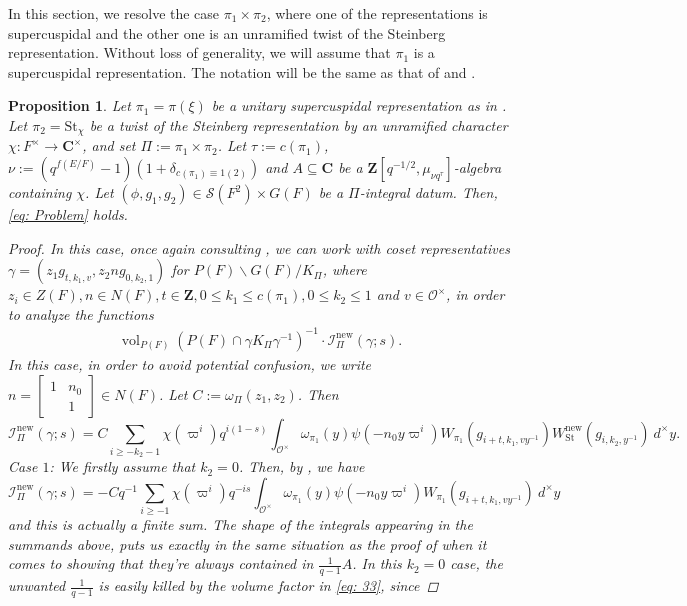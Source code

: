 \documentclass{amsart}
\theoremstyle{plain}
\newtheorem{prop}[thm]{Proposition}
\theoremstyle{plain}
\theoremstyle{remark}
\DeclareMathOperator{\vol}{vol}
\begin{document}
In this section, we resolve the case $\pi_1\times \pi_2$, where one of the representations is supercuspidal and the other one is an unramified twist of the Steinberg representation. Without loss of generality, we will assume that $\pi_1$ is a supercuspidal representation. The notation will be the same as that of  and .
\begin{prop}\label{thm sup x unr St}
    Let $\pi_1=\pi(\xi)$ be a unitary supercuspidal representation as in \emph{}. Let $\pi_2=\mathrm{St}_\chi$ be a twist of the Steinberg representation by an unramified character $\chi:F^\times\rightarrow\mathbf{C}^\times$, and set $\Pi:=\pi_1\times \pi_2$. Let $\tau:=c(\pi_1)$, $\nu:=(q^{f(E/F)}-1)(1+\delta_{c(\pi_1)\equiv 1(2)})$ and $A\subseteq\mathbf{C}$ be a $\mathbf{Z}[q^{-1/2},\mu_{\nu q^\tau}]$-algebra containing $\chi$. Let $(\phi,g_1,g_2)\in\mathcal{S}(F^2)\times G(F)$ be a $\Pi$-integral datum. Then, \eqref{eq: Problem} holds.
    \begin{proof}
        In this case, once again consulting , we can work with coset representatives $\gamma=(z_1g_{t,k_1,v},z_2ng_{0,k_2,1})$ for $P(F)\backslash G(F)/K_\Pi$, where $z_i\in Z(F), n\in N(F), t\in\mathbf{Z}, 0\leq k_1\leq c(\pi_1), 0\leq k_2\leq 1$ and $v\in\mathcal{O}^\times$, in order to analyze the functions 
        \begin{align}\label{eq: 33}
            \vol_{P(F)}\left(P(F)\cap \gamma K_\Pi \gamma^{-1}\right)^{-1}\cdot \mathcal{I}_{\Pi}^\mathrm{new}(\gamma;s).
        \end{align}
        In this case, in order to avoid potential confusion, we write $n=\left[\begin{smallmatrix}
            1 & n_0\\
            & 1
        \end{smallmatrix}\right]\in N(F)$.
        Let $C:=\omega_\Pi(z_1,z_2)$. Then
        $$\mathcal{I}_{\Pi}^\mathrm{new}(\gamma;s)=C\sum_{i\geq -k_2-1}\chi(\varpi^i)q^{i(1-s)}\int_{\mathcal{O}^\times}\omega_{\pi_1}(y)\psi(-n_0y\varpi^i)W_{\pi_1}(g_{i+t,k_1,vy^{-1}})W_{\mathrm{St}}^\mathrm{new}(g_{i,k_2,y^{-1}})\ d^\times y. $$
        \textit{Case} $1$: We firstly assume that $k_2=0$. Then, by , we have 
        $$\mathcal{I}_{\Pi}^\mathrm{new}(\gamma;s)=-Cq^{-1}\sum_{i\geq -1}\chi(\varpi^i)q^{-is}\int_{\mathcal{O}^\times}\omega_{\pi_1}(y)\psi(-n_0y\varpi^i)W_{\pi_1}(g_{i+t,k_1,vy^{-1}})\ d^\times y$$
        and this is actually a finite sum. The shape of the integrals appearing in the summands above, puts us exactly in the same situation as the proof of  when it comes to showing that they're always contained in $\tfrac{1}{q-1}A$. In this $k_2=0$ case, the unwanted $\tfrac{1}{q-1}$ is easily killed by the volume factor in \eqref{eq: 33}, since 

\end{proof}
\end{prop}
\end{document}
